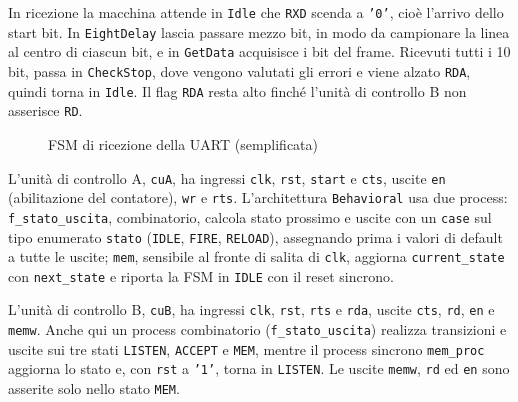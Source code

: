 In ricezione la macchina attende in \texttt{Idle} che \texttt{RXD} scenda a \texttt{'0'}, cioè l'arrivo dello start bit. In \texttt{EightDelay} lascia passare mezzo bit, in modo da campionare la linea al centro di ciascun bit, e in \texttt{GetData} acquisisce i bit del frame. Ricevuti tutti i 10 bit, passa in \texttt{CheckStop}, dove vengono valutati gli errori e viene alzato \texttt{RDA}, quindi torna in \texttt{Idle}. Il flag \texttt{RDA} resta alto finché l'unità di controllo B non asserisce \texttt{RD}.

\begin{figure}[H]
  \centering
  \caption{FSM di ricezione della UART (semplificata)}
  \label{fig:esercizio10-1:uart-rx}
\end{figure}

L'unità di controllo A, \texttt{cuA}, ha ingressi \texttt{clk}, \texttt{rst}, \texttt{start} e \texttt{cts}, uscite \texttt{en} (abilitazione del contatore), \texttt{wr} e \texttt{rts}. L'architettura \texttt{Behavioral} usa due process: \texttt{f\_stato\_uscita}, combinatorio, calcola stato prossimo e uscite con un \texttt{case} sul tipo enumerato \texttt{stato} (\texttt{IDLE}, \texttt{FIRE}, \texttt{RELOAD}), assegnando prima i valori di default a tutte le uscite; \texttt{mem}, sensibile al fronte di salita di \texttt{clk}, aggiorna \texttt{current\_state} con \texttt{next\_state} e riporta la FSM in \texttt{IDLE} con il reset sincrono.


L'unità di controllo B, \texttt{cuB}, ha ingressi \texttt{clk}, \texttt{rst}, \texttt{rts} e \texttt{rda}, uscite \texttt{cts}, \texttt{rd}, \texttt{en} e \texttt{memw}. Anche qui un process combinatorio (\texttt{f\_stato\_uscita}) realizza transizioni e uscite sui tre stati \texttt{LISTEN}, \texttt{ACCEPT} e \texttt{MEM}, mentre il process sincrono \texttt{mem\_proc} aggiorna lo stato e, con \texttt{rst} a \texttt{'1'}, torna in \texttt{LISTEN}. Le uscite \texttt{memw}, \texttt{rd} ed \texttt{en} sono asserite solo nello stato \texttt{MEM}.

